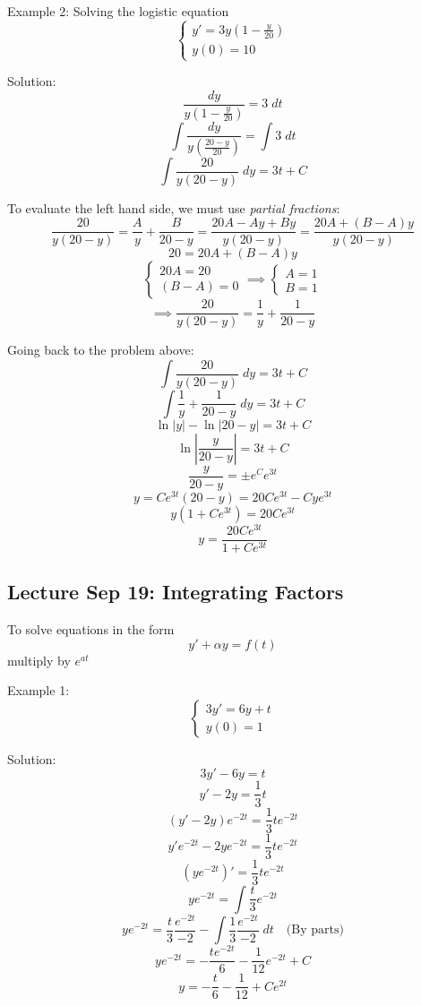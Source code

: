 \documentclass[12pt]{article}
\begin{document}
Example 2: Solving the logistic equation
\[\begin{cases}
    y' = 3y\left(1 - \frac{y}{20}\right)\\
    y(0) = 10
\end{cases}\]

Solution:
\[\frac{dy}{y (1 - \frac{y}{20})} = 3\; dt\]
\[\int \frac{dy}{y (\frac{20 - y}{20})} = \int 3 \; dt\]
\[\int \frac{20}{y(20 - y)}\; dy = 3t + C\]

To evaluate the left hand side, we must use \emph{partial fractions}:
\[\frac{20}{y(20 - y)} = \frac{A}{y} + \frac{B}{20 - y} = \frac{20A - Ay + By}{y(20 - y)} = \frac{20A + (B - A)y}{y(20 - y)}\]
\[20 = 20A + (B - A)y\]
\[\begin{cases}
    20A = 20\\
    (B - A) = 0
\end{cases} \implies \begin{cases}
    A = 1\\
    B = 1
\end{cases}\]
\[\implies \frac{20}{y (20 - y)} = \frac{1}{y} + \frac{1}{20 - y}\]

Going back to the problem above:
\[\int \frac{20}{y(20 - y)}\; dy = 3t + C\]
\[\int \frac{1}{y} + \frac{1}{20 - y}\; dy = 3t + C\]
\[\ln |y| - \ln |20 - y| = 3t + C\]
\[\ln \left|\frac{y}{20 - y}\right| = 3t + C\]
\[\frac{y}{20 - y} = \pm e^C e^{3t}\]
\[y = Ce^{3t} (20 - y) = 20Ce^{3t} - Cye^{3t}\]
\[y(1 + Ce^{3t}) = 20Ce^{3t}\]
\[\boxed{y = \frac{20Ce^{3t}}{1 + Ce^{3t}}}\]

\subsection*{Lecture Sep 19: Integrating Factors}
To solve equations in the form
\[y' + \alpha y = f(t)\]
multiply by $e^{at}$

Example 1: 
\[\begin{cases}
    3y' = 6y + t\\
    y(0) = 1
\end{cases}\]

Solution:
\[3y' - 6y = t\]
\[y' - 2y = \frac{1}{3}t\]
\[(y' - 2y)e^{-2t} = \frac{1}{3}te^{-2t}\]
\[y'e^{-2t} - 2y e^{-2t} = \frac{1}{3}te^{-2t} \]
\[(y e^{-2t})' = \frac{1}{3}te^{-2t}\]
\[y e^{-2t} = \int \frac{t}{3}e^{-2t}\]
\[y e^{-2t} = \frac{t}{3} \frac{e^{-2t}}{-2} - \int \frac{1}{3} \frac{e^{-2t}}{-2}\; dt \quad \text{(By parts)}\]
\[y e^{-2t} = -\frac{te^{-2t}}{6} - \frac{1}{12}e^{-2t}+C\]
\[\boxed{y = -\frac{t}{6} - \frac{1}{12} + Ce^{2t}}\]
\end{document}
